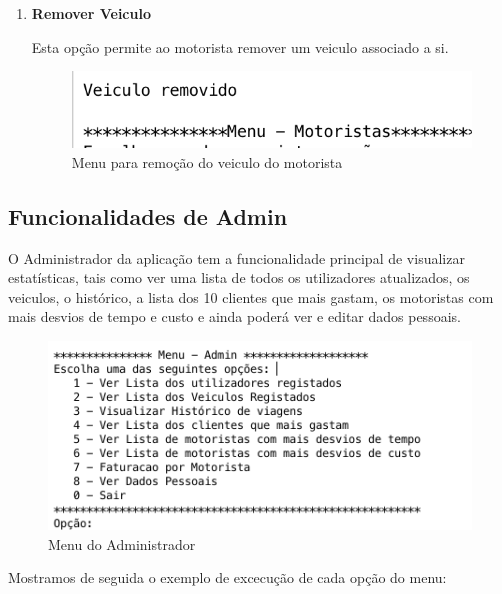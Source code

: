 \begin{enumerate}
\item \textbf{Remover Veiculo}

Esta opção permite ao motorista remover um veiculo associado a si. 
\begin{figure}[htpb]
	\centering
	\includegraphics[scale=0.6]{imagem/veiculoRemovido}
	\caption{Menu para remoção do veiculo do motorista}
	\label{p3:fig:p3_veiculoRemovido}
\end{figure}

\end{enumerate}
\subsection{Funcionalidades de Admin}
O Administrador da aplicação tem a funcionalidade principal de visualizar estatísticas, tais como ver uma lista de todos os utilizadores atualizados, os veiculos, o histórico, a lista dos 10 clientes que mais gastam, os motoristas com mais desvios de tempo e custo e ainda poderá ver e editar dados pessoais. 

\begin{figure}[htpb]
	\centering
	\includegraphics[scale=0.6]{imagem/menuAdmin}
	\caption{Menu do Administrador }
	\label{p3:fig:p3_menuAdmin}
\end{figure}

\newpage
Mostramos de seguida o exemplo de excecução de cada opção do menu: 

